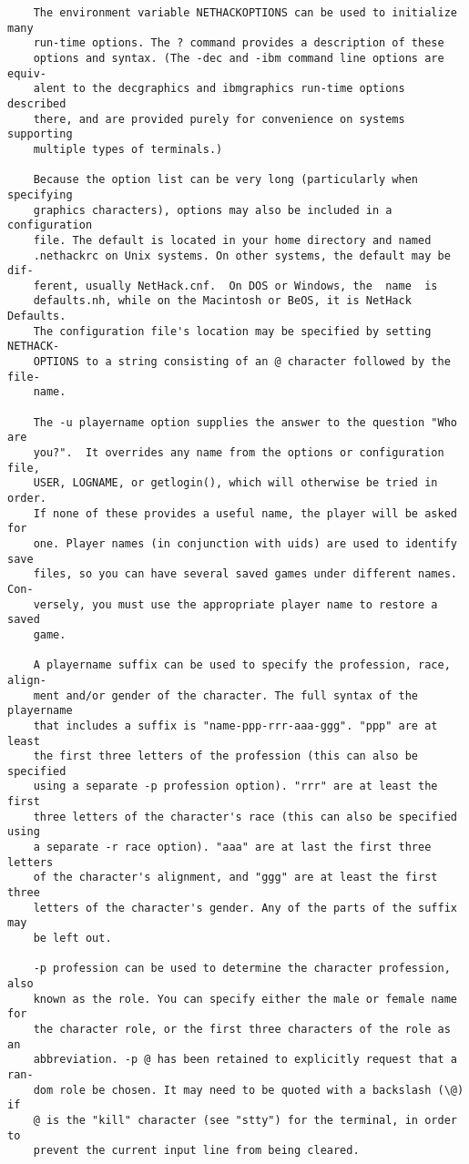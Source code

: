 \documentclass[11pt]{article}
\begin{document}
\begin{verbatim}
    The environment variable NETHACKOPTIONS can be used to initialize many
    run-time options. The ? command provides a description of these
    options and syntax. (The -dec and -ibm command line options are equiv-
    alent to the decgraphics and ibmgraphics run-time options described
    there, and are provided purely for convenience on systems supporting
    multiple types of terminals.)

    Because the option list can be very long (particularly when specifying
    graphics characters), options may also be included in a configuration
    file. The default is located in your home directory and named
    .nethackrc on Unix systems. On other systems, the default may be dif-
    ferent, usually NetHack.cnf.  On DOS or Windows, the  name  is
    defaults.nh, while on the Macintosh or BeOS, it is NetHack Defaults.
    The configuration file's location may be specified by setting NETHACK-
    OPTIONS to a string consisting of an @ character followed by the file-
    name.

    The -u playername option supplies the answer to the question "Who are
    you?".  It overrides any name from the options or configuration file,
    USER, LOGNAME, or getlogin(), which will otherwise be tried in order.
    If none of these provides a useful name, the player will be asked for
    one. Player names (in conjunction with uids) are used to identify save
    files, so you can have several saved games under different names. Con-
    versely, you must use the appropriate player name to restore a saved
    game.

    A playername suffix can be used to specify the profession, race, align-
    ment and/or gender of the character. The full syntax of the playername
    that includes a suffix is "name-ppp-rrr-aaa-ggg". "ppp" are at least
    the first three letters of the profession (this can also be specified
    using a separate -p profession option). "rrr" are at least the first
    three letters of the character's race (this can also be specified using
    a separate -r race option). "aaa" are at last the first three letters
    of the character's alignment, and "ggg" are at least the first three
    letters of the character's gender. Any of the parts of the suffix may
    be left out.

    -p profession can be used to determine the character profession, also
    known as the role. You can specify either the male or female name for
    the character role, or the first three characters of the role as an
    abbreviation. -p @ has been retained to explicitly request that a ran-
    dom role be chosen. It may need to be quoted with a backslash (\@) if
    @ is the "kill" character (see "stty") for the terminal, in order to
    prevent the current input line from being cleared.


\end{verbatim}
\end{document}
